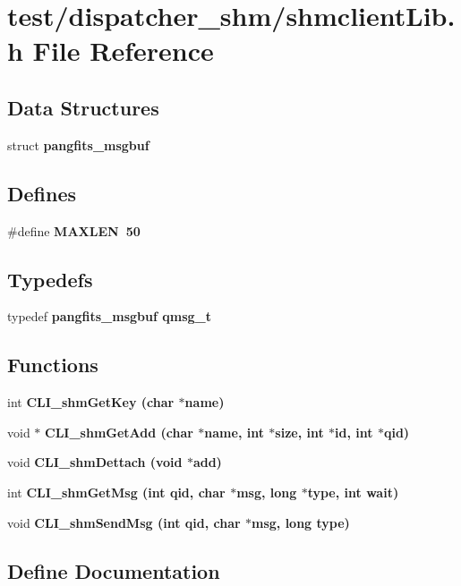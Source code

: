 \section{test/dispatcher\_\-shm/shmclient\-Lib.h File Reference}
\label{dispatcher__shm_2shmclientLib_8h}
\subsection*{Data Structures}
\begin{CompactItemize}
\item 
struct \bf{pangfits\_\-msgbuf}
\end{CompactItemize}
\subsection*{Defines}
\begin{CompactItemize}
\item 
\#define \bf{MAXLEN}~50
\end{CompactItemize}
\subsection*{Typedefs}
\begin{CompactItemize}
\item 
typedef \bf{pangfits\_\-msgbuf} \bf{qmsg\_\-t}
\end{CompactItemize}
\subsection*{Functions}
\begin{CompactItemize}
\item 
int \bf{CLI\_\-shm\-Get\-Key} (char $\ast$name)
\item 
void $\ast$ \bf{CLI\_\-shm\-Get\-Add} (char $\ast$name, int $\ast$size, int $\ast$id, int $\ast$qid)
\item 
void \bf{CLI\_\-shm\-Dettach} (void $\ast$add)
\item 
int \bf{CLI\_\-shm\-Get\-Msg} (int qid, char $\ast$msg, long $\ast$type, int wait)
\item 
void \bf{CLI\_\-shm\-Send\-Msg} (int qid, char $\ast$msg, long type)
\end{CompactItemize}


\subsection{Define Documentation}

